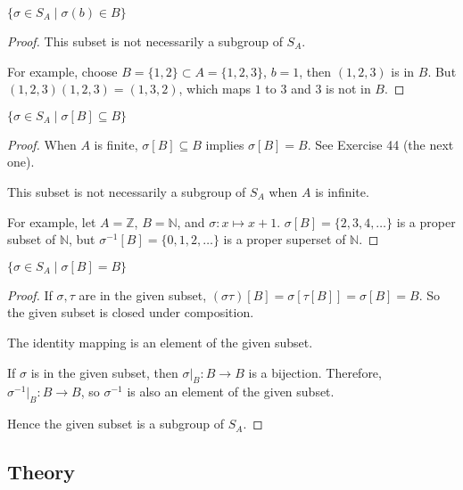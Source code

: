 \begin{exercise}
    $\{ \sigma \in S_{A} \mid \sigma(b) \in B \}$
\end{exercise}

\begin{proof}
    This subset is not necessarily a subgroup of $S_{A}$.

    For example, choose $B = \{ 1, 2 \} \subset A = \{ 1, 2, 3 \}$, $b = 1$, then $(1, 2, 3)$ is in $B$. But $(1, 2, 3)(1, 2, 3) = (1, 3, 2)$, which maps $1$ to $3$ and $3$ is not in $B$.
\end{proof}

\begin{exercise}
    $\{ \sigma \in S_{A} \mid \sigma[B] \subseteq B \}$
\end{exercise}

\begin{proof}
    When $A$ is finite, $\sigma[B] \subseteq B$ implies $\sigma[B] = B$. See Exercise 44 (the next one).

    This subset is not necessarily a subgroup of $S_{A}$ when $A$ is infinite.

    For example, let $A = \mathbb{Z}$, $B = \mathbb{N}$, and $\sigma: x \mapsto x + 1$. $\sigma[B] = \{ 2, 3, 4, \ldots \}$ is a proper subset of $\mathbb{N}$, but $\sigma^{-1}[B] = \{ 0, 1, 2, \ldots \}$ is a proper superset of $\mathbb{N}$.
\end{proof}

\begin{exercise}
    $\{ \sigma \in S_{A} \mid \sigma[B] = B \}$
\end{exercise}

\begin{proof}
    If $\sigma, \tau$ are in the given subset, $(\sigma\tau)[B] = \sigma[\tau[B]] = \sigma[B] = B$. So the given subset is closed under composition.

    The identity mapping is an element of the given subset.

    If $\sigma$ is in the given subset, then $\sigma\vert_{B}: B \to B$ is a bijection. Therefore, $\sigma^{-1}\vert_{B}: B \to B$, so $\sigma^{-1}$ is also an element of the given subset.

    Hence the given subset is a subgroup of $S_{A}$.
\end{proof}

\subsection*{Theory}

